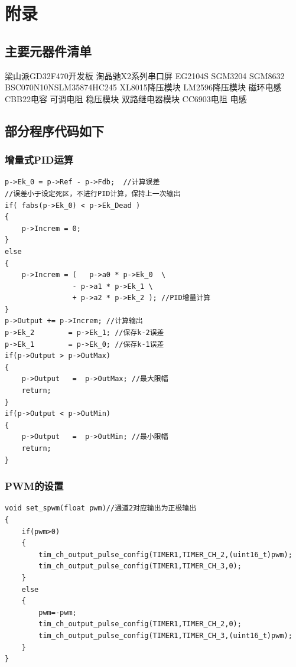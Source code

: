 \documentclass[a4paper,12pt]{article}
\begin{document}
\nocite{*}
\printbibliography


\newpage

\appendix
\section{附录}
\subsection{主要元器件清单}
\noindent 梁山派GD32F470开发板 \quad 淘晶驰X2系列串口屏 
\quad EG2104S \quad SGM3204 \quad SGM8632 
\quad BSC070N10NS\quad LM358\quad 74HC245
\quad XL8015降压模块 \quad LM2596降压模块
\quad 磁环电感\quad CBB22电容
\quad 可调电阻 \quad 稳压模块 \quad 双路继电器模块 
\quad CC6903\quad 电阻 \quad 电感 
\subsection{部分程序代码如下}
\subsubsection{增量式PID运算}\label{pid}
\begin{verbatim}
p->Ek_0 = p->Ref - p->Fdb;  //计算误差
//误差小于设定死区，不进行PID计算，保持上一次输出
if( fabs(p->Ek_0) < p->Ek_Dead )
{
    p->Increm = 0;
}
else
{
    p->Increm = (   p->a0 * p->Ek_0  \
                - p->a1 * p->Ek_1 \
                + p->a2 * p->Ek_2 ); //PID增量计算  
}
p->Output += p->Increm; //计算输出
p->Ek_2        = p->Ek_1; //保存k-2误差
p->Ek_1        = p->Ek_0; //保存k-1误差
if(p->Output > p->OutMax)
{
    p->Output   =  p->OutMax; //最大限幅
    return;
}
if(p->Output < p->OutMin)
{
    p->Output   =  p->OutMin; //最小限幅
    return;
}
\end{verbatim} 
\subsubsection{PWM的设置}\label{set_spwm}
\begin{verbatim}
void set_spwm(float pwm)//通道2对应输出为正极输出
{
    if(pwm>0)
    {
        tim_ch_output_pulse_config(TIMER1,TIMER_CH_2,(uint16_t)pwm);
        tim_ch_output_pulse_config(TIMER1,TIMER_CH_3,0);
    }
    else
    {
        pwm=-pwm;
        tim_ch_output_pulse_config(TIMER1,TIMER_CH_2,0);
        tim_ch_output_pulse_config(TIMER1,TIMER_CH_3,(uint16_t)pwm);   
    }
}
\end{verbatim}
\end{document}
